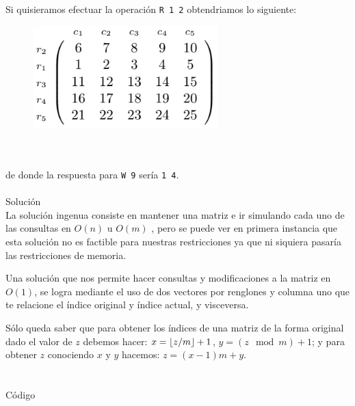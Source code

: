 \documentclass[12pt]{article}
\begin{document}
\\Si quisieramos efectuar la operación \texttt{R 1 2} obtendriamos lo siguiente:
\begin{figure}[h!] 
\begin{center} 
\includegraphics[scale = .8]{a2.PNG}\hspace{50mm}  
\end{center} 
\end{figure}\\
\\ de donde la respuesta para \texttt{W 9} sería \texttt{1 4}.
\\
\\
\textrm{\large Solución}\\

La solución ingenua consiste en mantener una matriz e ir simulando cada uno de las consultas en $O(n)$ u $O(m)$ , pero se puede ver en primera instancia que esta solución no es factible para nuestras restricciones ya que ni siquiera pasaría las restricciones de memoria.

Una solución que nos permite hacer consultas y modificaciones a la matriz en $O(1)$, se logra mediante el uso de dos vectores por renglones y columna uno que te relacione el índice original y índice actual, y visceversa.

\DeclarePairedDelimiter\ceil{\lceil}{\rceil}
\DeclarePairedDelimiter\floor{\lfloor}{\rfloor}
Sólo queda saber que para obtener los índices de una matriz de la forma original dado el valor de $z$ debemos hacer: $x=\floor{z/m}+1$, $y=(z \mod m)+1$; y para obtener $z$ conociendo $x$ y $y$ hacemos: $z=(x-1)m + y$.\\ \\
\\
\textrm{\large Código}
\end{document}
